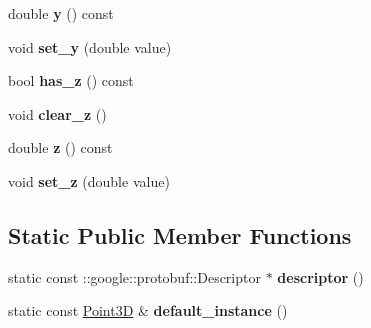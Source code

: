 \begin{DoxyCompactItemize}
\hypertarget{classstruct_definitions_1_1_point3_d_aeeea1fe4bd6b56727b50c569b71f8207}{}\label{classstruct_definitions_1_1_point3_d_aeeea1fe4bd6b56727b50c569b71f8207} 
double {\bfseries y} () const
\item 
\hypertarget{classstruct_definitions_1_1_point3_d_ab16605963ed87b26185628feafb6d34d}{}\label{classstruct_definitions_1_1_point3_d_ab16605963ed87b26185628feafb6d34d} 
void {\bfseries set\+\_\+y} (double value)
\item 
\hypertarget{classstruct_definitions_1_1_point3_d_a69b505cb0b4ea40c8156580c2842ece4}{}\label{classstruct_definitions_1_1_point3_d_a69b505cb0b4ea40c8156580c2842ece4} 
bool {\bfseries has\+\_\+z} () const
\item 
\hypertarget{classstruct_definitions_1_1_point3_d_aad3bc9a390f0e239baf4b84467c15fff}{}\label{classstruct_definitions_1_1_point3_d_aad3bc9a390f0e239baf4b84467c15fff} 
void {\bfseries clear\+\_\+z} ()
\item 
\hypertarget{classstruct_definitions_1_1_point3_d_ad663c810a730a64d1e000e366fc366ea}{}\label{classstruct_definitions_1_1_point3_d_ad663c810a730a64d1e000e366fc366ea} 
double {\bfseries z} () const
\item 
\hypertarget{classstruct_definitions_1_1_point3_d_a10d2970c8df645a70ea4cd04bdb901b4}{}\label{classstruct_definitions_1_1_point3_d_a10d2970c8df645a70ea4cd04bdb901b4} 
void {\bfseries set\+\_\+z} (double value)
\end{DoxyCompactItemize}
\subsection*{Static Public Member Functions}
\begin{DoxyCompactItemize}
\item 
\hypertarget{classstruct_definitions_1_1_point3_d_aac6df7f0cfd52e4db0ec70609bdfc476}{}\label{classstruct_definitions_1_1_point3_d_aac6df7f0cfd52e4db0ec70609bdfc476} 
static const \+::google\+::protobuf\+::\+Descriptor $\ast$ {\bfseries descriptor} ()
\item 
\hypertarget{classstruct_definitions_1_1_point3_d_a067440c44bd48e01b967c8595b22484f}{}\label{classstruct_definitions_1_1_point3_d_a067440c44bd48e01b967c8595b22484f} 
static const \hyperlink{classstruct_definitions_1_1_point3_d}{Point3D} \& {\bfseries default\+\_\+instance} ()
\end{DoxyCompactItemize}
